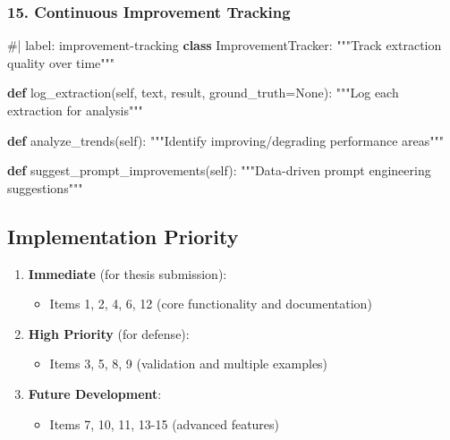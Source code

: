 \documentclass[
  11pt,
  letterpaper,
]{book}
\newenvironment{Shaded}{\begin{snugshade}}{\end{snugshade}}
\newcommand{\CommentTok}[1]{\textcolor[rgb]{0.37,0.37,0.37}{#1}}
\newcommand{\KeywordTok}[1]{\textcolor[rgb]{0.00,0.23,0.31}{\textbf{#1}}}
\newcommand{\NormalTok}[1]{\textcolor[rgb]{0.00,0.23,0.31}{#1}}
\newcommand{\OperatorTok}[1]{\textcolor[rgb]{0.37,0.37,0.37}{#1}}
\newcommand{\VariableTok}[1]{\textcolor[rgb]{0.07,0.07,0.07}{#1}}
\providecommand{\tightlist}{%
  \setlength{\itemsep}{0pt}\setlength{\parskip}{0pt}}
\begin{document}
\subsubsection{15. Continuous Improvement
Tracking}\label{continuous-improvement-tracking}

\begin{Shaded}
\begin{Highlighting}[]
\CommentTok{\#| label: improvement{-}tracking}
\KeywordTok{class}\NormalTok{ ImprovementTracker:}
    \CommentTok{"""Track extraction quality over time"""}
    
    \KeywordTok{def}\NormalTok{ log\_extraction(}\VariableTok{self}\NormalTok{, text, result, ground\_truth}\OperatorTok{=}\VariableTok{None}\NormalTok{):}
        \CommentTok{"""Log each extraction for analysis"""}
        
    \KeywordTok{def}\NormalTok{ analyze\_trends(}\VariableTok{self}\NormalTok{):}
        \CommentTok{"""Identify improving/degrading performance areas"""}
        
    \KeywordTok{def}\NormalTok{ suggest\_prompt\_improvements(}\VariableTok{self}\NormalTok{):}
        \CommentTok{"""Data{-}driven prompt engineering suggestions"""}
\end{Highlighting}
\end{Shaded}

\subsection{Implementation Priority}\label{implementation-priority}

\begin{enumerate}
\def\labelenumi{\arabic{enumi}.}
\tightlist
\item
  \textbf{Immediate} (for thesis submission):

  \begin{itemize}
  \tightlist
  \item
    Items 1, 2, 4, 6, 12 (core functionality and documentation)
  \end{itemize}
\item
  \textbf{High Priority} (for defense):

  \begin{itemize}
  \tightlist
  \item
    Items 3, 5, 8, 9 (validation and multiple examples)
  \end{itemize}
\item
  \textbf{Future Development}:

  \begin{itemize}
  \tightlist
  \item
    Items 7, 10, 11, 13-15 (advanced features)
  \end{itemize}
\end{enumerate}
\end{document}
